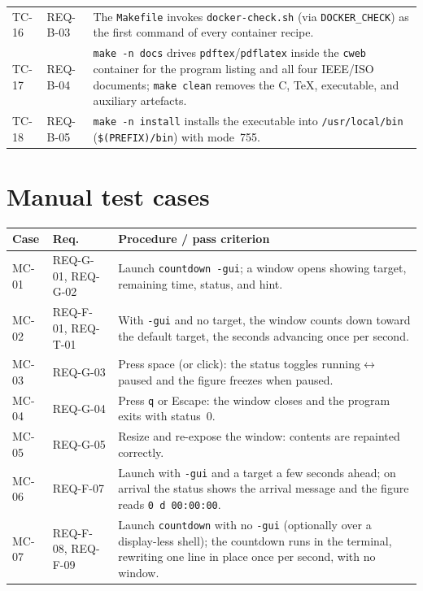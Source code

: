 \documentclass[12pt]{article}
\newcommand{\code}[1]{\texttt{#1}}
\begin{document}
\begin{longtable}{p{}p{}p{}}
TC-16 & REQ-B-03 & The \code{Makefile} invokes \code{docker-check.sh} (via \code{DOCKER\_CHECK}) as the first command of every container recipe. \\
TC-17 & REQ-B-04 & \code{make -n docs} drives \code{pdftex}/\code{pdflatex} inside the \code{cweb} container for the program listing and all four IEEE/ISO documents; \code{make clean} removes the C, \TeX, executable, and auxiliary artefacts. \\
TC-18 & REQ-B-05 & \code{make -n install} installs the executable into \code{/usr/local/bin} (\code{\$(PREFIX)/bin}) with mode~755. \\
\bottomrule
\end{longtable}

\section{Manual test cases}

\begin{longtable}{p{}p{}p{}}
\toprule
\textbf{Case} & \textbf{Req.} & \textbf{Procedure / pass criterion} \\
\midrule
\endhead
MC-01 & REQ-G-01, REQ-G-02 & Launch \code{countdown -gui}; a window opens showing target, remaining time, status, and hint. \\
MC-02 & REQ-F-01, REQ-T-01 & With \code{-gui} and no target, the window counts down toward the default target, the seconds advancing once per second. \\
MC-03 & REQ-G-03 & Press space (or click): the status toggles running$\leftrightarrow$paused and the figure freezes when paused. \\
MC-04 & REQ-G-04 & Press \code{q} or Escape: the window closes and the program exits with status~0. \\
MC-05 & REQ-G-05 & Resize and re-expose the window: contents are repainted correctly. \\
MC-06 & REQ-F-07 & Launch with \code{-gui} and a target a few seconds ahead; on arrival the status shows the arrival message and the figure reads \code{0 d 00:00:00}. \\
MC-07 & REQ-F-08, REQ-F-09 & Launch \code{countdown} with no \code{-gui} (optionally over a display-less shell); the countdown runs in the terminal, rewriting one line in place once per second, with no window. \\
\bottomrule
\end{longtable}
\end{document}
